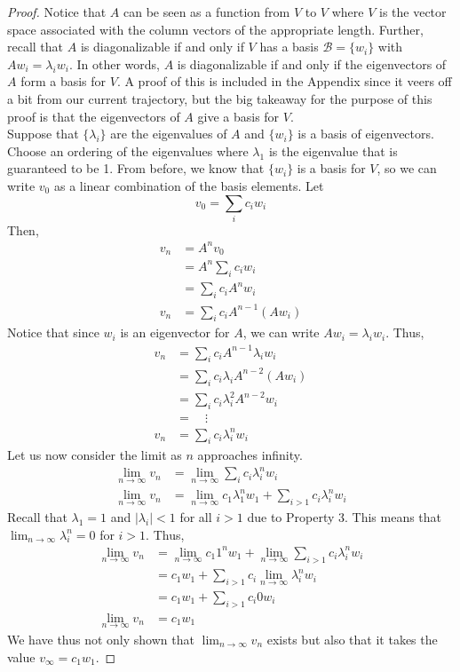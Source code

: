 \documentclass[10pt]{article}
\newcommand{\mcb}{\mathcal{B}}
\begin{document}
\begin{proof}
Notice that $A$ can be seen as a function from $V$ to $V$ where $V$ is the vector space associated with the column vectors of the appropriate length. Further, recall that $A$ is diagonalizable if and only if $V$ has a basis $\mcb=\{w_i\}$ with $Aw_i = \lambda_iw_i$. In other words, $A$ is diagonalizable if and only if the eigenvectors of $A$ form a basis for $V$. A proof of this is included in the Appendix since it veers off a bit from our current trajectory, but the big takeaway for the purpose of this proof is that the eigenvectors of $A$ give a basis for $V$.\vspace{0.5cm}\\
Suppose that $\{\lambda_i\}$ are the eigenvalues of $A$ and $\{w_i\}$ is a basis of eigenvectors. Choose an ordering of the eigenvalues where $\lambda_1$ is the eigenvalue that is guaranteed to be 1. From before, we know that $\{w_i\}$ is a basis for $V$, so we can write $v_0$ as a linear combination of the basis elements. Let
\[v_0 = \sum_i c_iw_i\]
Then,
\begin{align*}
    v_n &= A^n v_0\\
    &= A^n\sum_i c_iw_i\\
    &= \sum_i c_iA^nw_i\\
    v_n & = \sum_i c_iA^{n-1} (A w_i)
\end{align*}
Notice that since $w_i$ is an eigenvector for $A$, we can write $Aw_i=\lambda_i w_i$. Thus,
\begin{align*}
    v_n &= \sum_i c_iA^{n-1} \lambda_i w_i\\
    &= \sum_i c_i\lambda_i A^{n-2} (A w_i)\\
    &= \sum_i c_i\lambda_i^2 A^{n-2} w_i\\
    &= \quad \vdots\\
    v_n &= \sum_i c_i \lambda_i^n w_i
\end{align*}
Let us now consider the limit as $n$ approaches infinity.
\begin{align*}
    \lim_{n\rightarrow\infty} v_n &= \lim_{n\rightarrow\infty} \sum_i c_i \lambda_i^n w_i\\
    \lim_{n\rightarrow\infty} v_n&= \lim_{n\rightarrow\infty} c_1 \lambda_1^n w_1 + \sum_{i>1} c_i \lambda_i^n w_i
\end{align*}
Recall that $\lambda_1=1$ and $|\lambda_i|<1$ for all $i>1$ due to Property 3. This means that $\lim_{n\rightarrow\infty} \lambda_i^n = 0$ for $i>1$. Thus,
\begin{align*}
    \lim_{n\rightarrow\infty} v_n &= \lim_{n\rightarrow\infty} c_1 1^n w_1 + \lim_{n\rightarrow\infty} \sum_{i>1} c_i \lambda_i^n w_i\\
    &= c_1 w_1 + \sum_{i>1} c_i \lim_{n\rightarrow\infty} \lambda_i^n w_i\\
    &= c_1 w_1 + \sum_{i>1} c_i 0 w_i\\
    \lim_{n\rightarrow\infty} v_n &= c_1 w_1
\end{align*}
We have thus not only shown that $\lim_{n\rightarrow\infty} v_n$ exists but also that it takes the value $v_\infty = c_1 w_1$.
\end{proof}
\newpage
\end{document}
